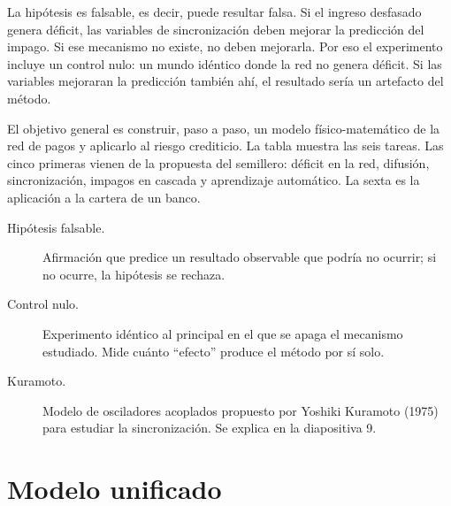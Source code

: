 \begin{decir}
La hipótesis es falsable, es decir, puede resultar falsa. Si el ingreso desfasado
genera déficit, las variables de sincronización deben mejorar la predicción del impago.
Si ese mecanismo no existe, no deben mejorarla. Por eso el experimento incluye un
control nulo: un mundo idéntico donde la red no genera déficit. Si las variables
mejoraran la predicción también ahí, el resultado sería un artefacto del método.

El objetivo general es construir, paso a paso, un modelo físico-matemático de la red de
pagos y aplicarlo al riesgo crediticio. La tabla muestra las seis tareas. Las cinco
primeras vienen de la propuesta del semillero: déficit en la red, difusión,
sincronización, impagos en cascada y aprendizaje automático. La sexta es la aplicación a
la cartera de un banco.
\end{decir}
\begin{terminos}
\begin{description}
\item[Hipótesis falsable.] Afirmación que predice un resultado observable que podría no
ocurrir; si no ocurre, la hipótesis se rechaza.
\item[Control nulo.] Experimento idéntico al principal en el que se apaga el mecanismo
estudiado. Mide cuánto ``efecto'' produce el método por sí solo.
\item[Kuramoto.] Modelo de osciladores acoplados propuesto por Yoshiki Kuramoto (1975)
para estudiar la sincronización. Se explica en la diapositiva 9.
\end{description}
\end{terminos}

\section{Modelo unificado}


